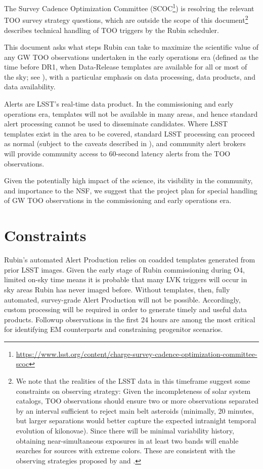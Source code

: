 \documentclass[DM,authoryear,toc]{lsstdoc}
\begin{document}
The Survey Cadence Optimization Committee (SCOC\footnote{\url{https://www.lsst.org/content/charge-survey-cadence-optimization-committee-scoc}}) is resolving the relevant TOO survey strategy questions, which are outside the scope of this document\footnote{We note that the realities of the LSST data in this timeframe suggest some constraints on observing strategy:  
Given the incompleteness of solar system catalogs, TOO observations should ensure two or more observations separated by an interval sufficient to reject main belt asteroids (minimally, 20 minutes, but larger separations would better capture the expected intranight temporal evolution of kilonovae).  
Since there will be minimal variability history, obtaining near-simultaneous exposures in at least two bands will enable searches for sources with extreme colors.  
These are consistent with the observing strategies proposed by \citet{2018arXiv181204051M} and \citet{2022ApJS..260...18A}.} 
 describes technical handling of TOO triggers by the Rubin scheduler.

This document asks what steps Rubin can take to maximize the scientific value of any GW TOO observations undertaken in the early operations era (defined as the time before DR1, when Data-Release templates are available for all or most of the sky; see ), with a particular emphasis on data processing, data products, and data availability.

Alerts are LSST's real-time data product.  
In the commissioning and early operations era, 
templates will not be available in many areas, and hence standard alert processing cannot be used to disseminate candidates.
Where LSST templates exist in the area to be covered, standard LSST processing can proceed as normal (subject to the caveats described in ), and community alert brokers will provide community access to 60-second latency alerts from the TOO observations.

Given the potentially high impact of the science, its visibility in the community, and importance to the NSF, we suggest that the project plan for special handling of GW TOO observations in the commissioning and early operations era.  

\section{Constraints} \label{sec:constraints}

Rubin's automated Alert Production relies on coadded templates generated from prior LSST images.  
Given the early stage of Rubin commissioning during O4, limited on-sky time means it is probable that many LVK triggers will occur in sky areas Rubin has never imaged before.
Without templates, then, fully automated, survey-grade Alert Production will not be possible. 
Accordingly, custom processing will be required in order to generate timely and useful data products.
Followup observations in the first 24 hours are among the most critical for identifying EM counterparts and constraining progenitor scenarios. 
\end{document}

